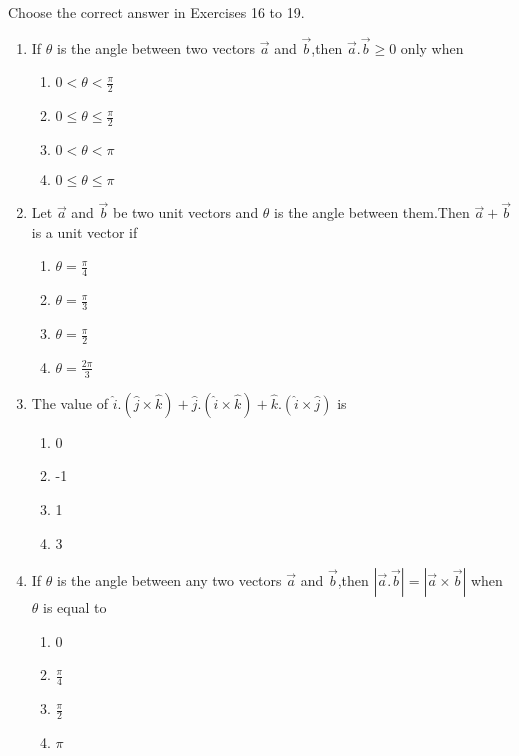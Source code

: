 Choose the correct answer in Exercises 16 to 19.
\begin{enumerate}[label=\thesection.\arabic*,ref=\thesection.\theenumi,resume*]

\item If $\theta$ is the angle between two vectors $\vec{a}$ and $\vec{b}$,then $\vec{a}.\vec{b}\geq0$ only when 
\begin{enumerate}
\item $0<\theta<\frac{\pi}{2}$
\item $0\leq\theta\leq\frac{\pi}{2}$
\item $0<\theta<\pi$
\item $0\leq\theta\leq\pi$
\end{enumerate}
\item Let $\vec{a}$ and $\vec{b}$ be two unit vectors and $\theta$ is the angle between them.Then $\vec{a}+\vec{b}$ is a unit vector if
\begin{enumerate}
\item $\theta=\frac{\pi}{4}$
\item $\theta=\frac{\pi}{3}$
\item $\theta=\frac{\pi}{2}$
\item $\theta=\frac{2\pi}{3}$
\end{enumerate}
\item The value of $\hat{i}.(\hat{j}\times\hat{k})+\hat{j}.(\hat{i}\times\hat{k})+\hat{k}.(\hat{i}\times\hat{j})$ is
\begin{enumerate}
\item 0
\item -1
\item 1
\item 3
\end{enumerate}
\item If $\theta$ is the angle between any two vectors $\vec{a}$ and $\vec{b}$,then $|\vec{a}.\vec{b}|=|\vec{a}\times\vec{b}|$ when $\theta$ is equal to
\begin{enumerate}
\item 0
\item $\frac{\pi}{4}$
\item $\frac{\pi}{2}$
\item $\pi$
\end{enumerate}

\end{enumerate}

